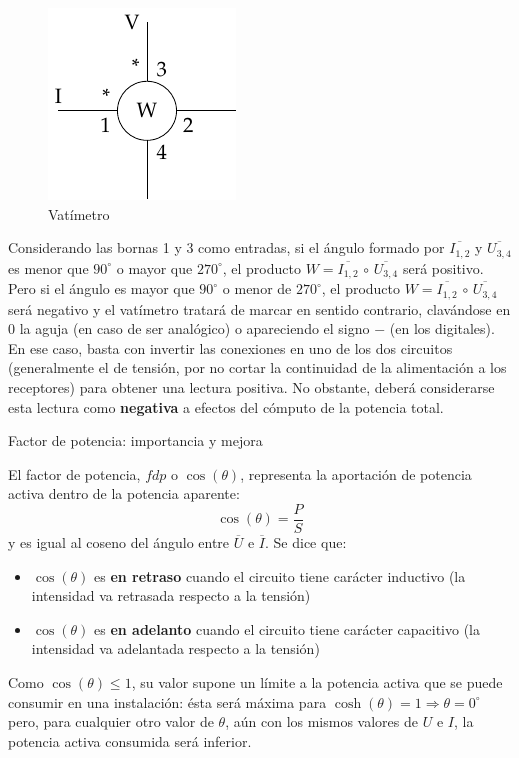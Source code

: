 \documentclass[11pt]{book} %
\makeatletter
\numberwithin{dummy}{section}
\theoremstyle{ocrenumbox}
\theoremstyle{blacknumex}
\theoremstyle{blacknumbox}
\theoremstyle{ocrenum}
\newenvironment{remark}{\par\vspace{10pt}\small %
\begin{list}{}{
\leftmargin=35pt %
\rightmargin=25pt}\item\ignorespaces %
\makebox[-2.5pt]{\begin{tikzpicture}[overlay]
\node[draw=ocre!60,line width=1pt,circle,fill=ocre!25,font=\sffamily\bfseries,inner sep=2pt,outer sep=0pt] at (-15pt,0pt){\textcolor{ocre}{N}};\end{tikzpicture}} %
\advance\baselineskip -1pt}{\end{list}\vskip5pt} %
\renewcommand{\section}{\@startsection{section}{1}{\z@}
{-4ex \@plus -1ex \@minus -.4ex}
{1ex \@plus.2ex }
{\normalfont\large\sffamily\bfseries}}
\newlength\esp
\makeatother
\begin{document}
	\begin{figure}[htbp]
	    \centering
	    \includegraphics{../figs/vatimetro_2.pdf}
	    \caption{Vatímetro}
	    \label{fig.vatimetro_2}
	\end{figure}
	Considerando las bornas 1 y 3 como entradas, si el ángulo formado por $\overline{I_{1,2}}$ y $\overline{U_{3,4}}$ es menor que $90^\circ$ o mayor que $270^\circ$, el producto $W=\overline{I_{1,2}}\,\circ\,\overline{U_{3,4}}$ será positivo. Pero si el ángulo es mayor que $90^\circ$ o menor de $270^\circ$, el producto $W=\overline{I_{1,2}}\,\circ\,\overline{U_{3,4}}$ será negativo y el vatímetro tratará de marcar en sentido contrario, clavándose en $0$ la aguja (en caso de ser analógico) o apareciendo el signo $-$ (en los digitales). En ese caso, basta con invertir las conexiones en uno de los dos circuitos (generalmente el de tensión, por no cortar la continuidad de la alimentación a los receptores) para obtener una lectura positiva. No obstante, deberá considerarse esta lectura como \textbf{negativa} a efectos del cómputo de la potencia total. 
	
	
	\section{Factor de potencia: importancia y mejora}\label{sec.mejora_fdp_monofasica}
	
	El factor de potencia, $fdp$ o $\cos(\theta)$, representa la aportación de potencia activa dentro de la potencia aparente:
	\begin{equation}
		\boxed{\cos(\theta)=\dfrac{P}{S}}
	\end{equation}
	y es igual al coseno del ángulo entre $\overline{U}$ e $\overline{I}$. Se dice que:
	\begin{itemize}
		\item $\cos(\theta)$ es \textbf{en retraso} cuando el circuito tiene carácter inductivo (la intensidad va retrasada respecto a la tensión)
		\item $\cos(\theta)$ es \textbf{en adelanto} cuando el circuito tiene carácter capacitivo (la intensidad va adelantada respecto a la tensión)
	\end{itemize}
	\begin{remark}
		Como $\cos(\theta)\leq 1$, su valor supone un límite a la potencia activa que se puede consumir en una instalación: ésta será máxima para $\cosh(\theta)=1\Rightarrow \theta=0^\circ$ pero, para cualquier otro valor de $\theta$, aún con los mismos valores de $U$ e $I$, la potencia activa consumida será inferior. 
	\end{remark}
	
\end{document}
